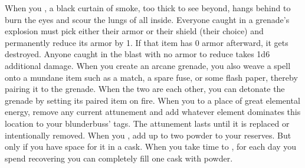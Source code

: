 \documentclass[darkmode]{dw_playbook}
\begin{document}
{{            
            \gapSm
            \gapSm
            }
        \gap
            {When you , a black curtain of smoke, too thick to see beyond, hangs behind to burn the eyes and scour the lungs of all inside.}
        \gap
            {Everyone caught in a grenade’s explosion must pick either their armor or their shield (their choice) and permanently reduce its armor by 1.  If that item has 0 armor afterward, it gets destroyed.  Anyone caught in the blast with no armor to reduce takes 1d6 additional damage.}
        \gap
            {When you create an arcane grenade, you also weave a spell onto a mundane item such as a match, a spare fuse, or some flash paper, thereby pairing it to the grenade.  When the two are  each other, you can detonate the grenade by setting its paired item on fire.}
    }
    {
            {When you  to a place of great elemental energy, remove any current attunement and add whatever element dominates this location to your blunderbuss’ tags.  The attunement lasts until it is replaced or intentionally removed.}
            {When you , add up to two powder to your reserves.  But only if you have space for it in a cask.  When you take time to , for each day you spend recovering you can completely fill one cask with powder.}
    }

\clearpage
~
\end{document}
